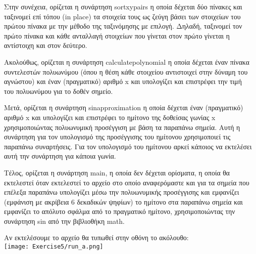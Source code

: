 \documentclass[a4paper,11pt]{article}
\newcommand{\lt}{\latintext}
\begin{document}
\par
Στην συνέχεια, ορίζεται η συνάρτηση {\lt sort\textunderscore xy\textunderscore pairs} η οποία δέχεται δύο πίνακες και ταξινομεί επί τόπου ({\lt in place}) τα στοιχεία τους ως ζεύγη βάσει των στοιχείων του πρώτου πίνακα με την μέθοδο της ταξινόμησης με επιλογή. Δηλαδή, ταξινομεί τον πρώτο πίνακα και κάθε ανταλλαγή στοιχείων που γίνεται στον πρώτο γίνεται η αντίστοιχη και στον δεύτερο.\\

\par
Ακολούθως, ορίζεται η συνάρτηση {\lt calculate\textunderscore polynomial} η οποία δέχεται έναν πίνακα συντελεστών πολυωνύμου (όπου η θέση κάθε στοιχείου αντιστοιχεί στην δύναμη του αγνώστου) και έναν (πραγματικό) αριθμό {\lt x} και υπολογίζει και επιστρέφει την τιμή του πολυωνύμου για το δοθέν σημείο.\\

\par
Μετά, ορίζεται η συνάρτηση {\lt sin\textunderscore approximation} η οποία δέχεται έναν (πραγματικό) αριθμό {\lt x} και υπολογίζει και επιστρέφει το ημίτονο της δοθείσας γωνίας {\lt x} χρησιμοποιώντας πολυωνυμική προσέγγιση με βάση τα παραπάνω σημεία. Αυτή η συνάρτηση για τον υπολογισμό της προσέγγισης του ημίτονου χρησιμοποιεί τις παραπάνω συναρτήσεις. Για τον υπολογισμό του ημίτονου αρκεί κάποιος να εκτελέσει αυτή την συνάρτηση για κάποια γωνία.\\

\par
Τέλος, ορίζεται η συνάρτηση {\lt main}, η οποία δεν δέχεται ορίσματα, η οποία θα εκτελεστεί όταν εκτελεστεί το αρχείο στο οποίο αναφερόμαστε και για τα σημεία που επέλεξα παραπάνω υπολογίζει μέσω την πολυωνυμικής προσέγγισης και εμφανίζει  (εμφάνιση με ακρίβεια 6 δεκαδικών ψηφίων) το ημίτονο στα παραπάνω σημεία και εμφανίζει το απόλυτο σφάλμα από το πραγματικό ημίτονο, χρησιμοποιώντας την συνάρτηση {\lt sin} από την βιβλιοθήκη {\lt math}.\\

\par
Αν εκτελέσουμε το αρχείο θα τυπωθεί στην οθόνη το ακόλουθο:\\
\texttt{[image: Exercise5/run\_a.png]}\\
\end{document}
